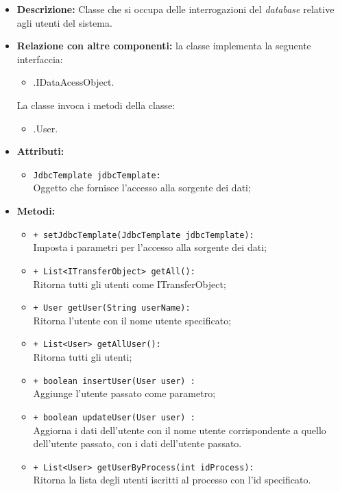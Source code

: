 \begin{flushleft}
\begin{itemize}
\item \textbf{Descrizione:} Classe che si occupa delle interrogazioni del \textit{database} relative agli utenti del sistema.
\item \textbf{Relazione con altre componenti:} la classe implementa la seguente interfaccia:
		\begin{itemize}
			\item \smodel{}.IDataAcessObject.
		\end{itemize}
		La classe invoca i metodi della classe:
		\begin{itemize}
			\item \smodel{}.User.
		\end{itemize}\item \textbf{Attributi:}
\begin{sloppypar}
\begin{itemize}
\item \texttt{JdbcTemplate jdbcTemplate:}\\ Oggetto che fornisce l'accesso alla sorgente dei dati;
\end{itemize}
\end{sloppypar}
\item \textbf{Metodi:}
\begin{sloppypar}
\begin{itemize}
\item \texttt{+ setJdbcTemplate(JdbcTemplate jdbcTemplate):}\\ Imposta i parametri per l'accesso alla sorgente dei dati;
\item \texttt{+ List<ITransferObject> getAll():}\\ Ritorna tutti gli utenti come ITransferObject; 
\item \texttt{+ User getUser(String userName):}\\ Ritorna l’utente con il nome utente specificato; 
\item \texttt{+ List<User> getAllUser():}\\ Ritorna tutti gli utenti;
\item \texttt{+ boolean insertUser(User user) :}\\ Aggiunge l'utente passato come parametro;
\item \texttt{+ boolean updateUser(User user) :}\\ Aggiorna i dati dell'utente con il nome utente corrispondente a quello dell'utente passato, con i dati dell'utente passato.
\item \texttt{+ List<User> getUserByProcess(int idProcess):}\\ Ritorna la lista degli utenti iscritti al  processo con l'id specificato.
\end{itemize}
\end{sloppypar}
\end{itemize}
\end{flushleft}

